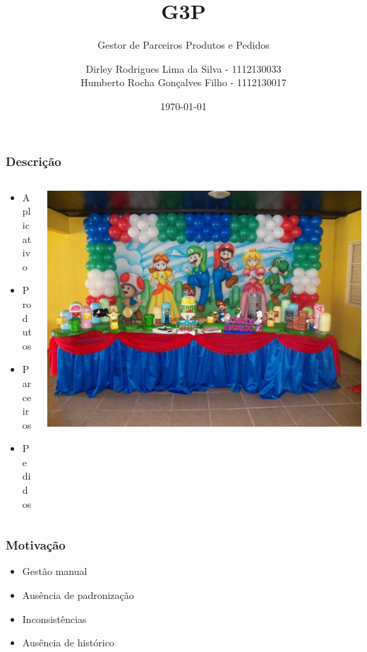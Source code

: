 \documentclass{beamer}
\title{\textbf{\Huge G3P}}
\subtitle{Gestor de Parceiros Produtos e Pedidos}
\author{
    Dirley Rodrigues Lima da Silva - 1112130033 \\
    Humberto Rocha Gonçalves Filho - 1112130017
}
\date{\today}
\begin{document}
\frame{\titlepage}

\begin{frame}
  \frametitle{Descrição}
  \begin{columns}[T]
    \begin{column}{.5\textwidth}
      \begin{itemize}
        \itemsep 1em
        \item Aplicativo
        \item Produtos
        \item Parceiros
        \item Pedidos
      \end{itemize}
    \end{column}
    \begin{column}{.5\textwidth}
      \includegraphics[width=\textwidth]{festa.jpg}
    \end{column}
  \end{columns}
\end{frame}

\begin{frame}
  \frametitle{Motivação}
  \begin{itemize}
    \itemsep 1em
    \item Gestão manual
    \item Ausência de padronização
    \item Inconsistências
    \item Ausência de histórico
  \end{itemize}
\end{frame}
\end{document}
